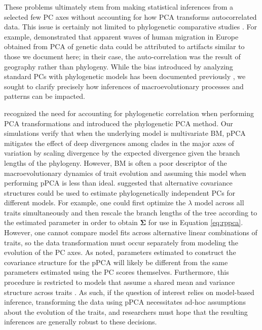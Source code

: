\documentclass[a4paper,11pt]{article}
\begin{document}
These problems ultimately stem from making statistical inferences from a selected few PC axes without accounting for how PCA transforms autocorrelated data. This issue is certainly not limited to phylogenetic comparative studies \citep[see][]{Richman1986, Podani2002, Novembre, Jolliffe2002, Bookstein2012}. For example, \citet{Novembre} demonstrated that apparent waves of human migration in Europe obtained from PCA of genetic data \citep[e.g.,][]{Cavalli} could be attributed to artifacts similar to those we document here; in their case, the auto-correlation was the result of geography rather than phylogeny. While the bias introduced by analyzing standard PCs with phylogenetic models has been documented previously \citep{Revell2008, Polly2013}, we sought to clarify precisely how inferences of macroevolutionary processes and patterns can be impacted.  

\citet{Revell2008} recognized the need for accounting for phylogenetic correlation when performing PCA transformations and introduced the phylogenetic PCA method. Our simulations verify that when the underlying model is multivariate BM, pPCA mitigates the effect of deep divergences among clades in the major axes of variation by scaling divergence by the expected divergence given the branch lengths of the phylogeny. However, BM is often a poor descriptor of the macroevolutionary dynamics of trait evolution \citep[for example, see][]{Harmon2010, Pennell-adequacy} and assuming this model when performing pPCA is less than ideal. \citet{Revell2008} suggested that alternative covariance structures could be used to estimate phylogenetically independent PCs for different models. For example, one could first optimize the $\lambda$ model \citep{Freckleton2002} across all traits simultaneously and then rescale the branch lengths of the tree according to the estimated parameter in order to obtain $\mathbf{\Sigma}$ for use in Equation \ref{eq:rppca}. However, one cannot compare model fits across alternative linear combinations of traits, so the data transformation must occur separately from modeling the evolution of the PC axes. As \citet{Revell2008} noted, parameters estimated to construct the covariance structure for the pPCA will likely be different from the same parameters estimated using the PC scores themselves. Furthermore, this procedure is restricted to models that assume a shared mean and variance structure across traits \citep[see][for examples where this does not apply]{Hansen2008, Hansen2012SysBio, Bartoszek2012}. As such, if the question of interest relies on model-based inference, transforming the data using pPCA necessitates ad-hoc assumptions about the evolution of the traits, and researchers must hope that the resulting inferences are generally robust to these decisions.
\end{document}
